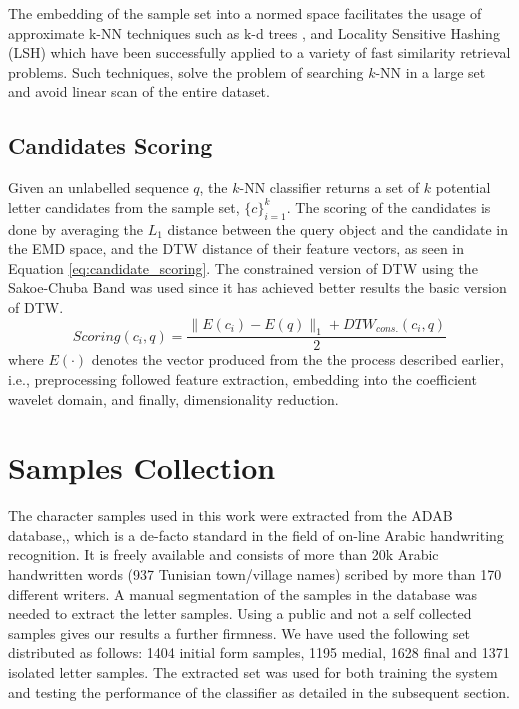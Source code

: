 \documentclass[10pt, conference, compsocconf]{IEEEtran}
\begin{document}
The embedding of the sample set into a normed space facilitates the usage of approximate k-NN techniques such as k-d trees \cite{bentley1975multidimensional}, and Locality Sensitive Hashing (LSH) \cite{gionis1999similarity} which have been successfully applied to a variety of fast similarity retrieval problems.
Such techniques, solve the problem of searching $k$-NN in a large set and avoid linear scan of the entire dataset.

\subsection{Candidates Scoring}
Given an unlabelled sequence $q$, the $k$-NN classifier returns a set of $k$ potential letter candidates from the sample set, $\{c\}_{i=1}^{k}$.
The scoring of the candidates is done by averaging the $L_1$ distance between the query object and the candidate in the EMD space, and the DTW distance of their feature vectors, as seen in Equation \ref{eq:candidate_scoring}.
The constrained version of DTW using the Sakoe-Chuba Band \cite{sakoe1978dynamic} was used since it has achieved better results the basic version of DTW.
\begin{equation}
Scoring(c_i,q)=\frac{\|E(c_i)-E(q)\|_1+DTW_{cons.}(c_i,q)}{2}
\label{eq:candidate_scoring}
\end{equation}
where $E(\cdot)$ denotes the vector produced from the the process described earlier, i.e., preprocessing followed feature extraction, embedding into the coefficient wavelet domain, and finally, dimensionality reduction.


\section{Samples Collection}
\label{sec:samples_collection}
The character samples used in this work were extracted from the ADAB database,\cite{el2009icdar}, which is a de-facto standard in the field of on-line Arabic handwriting recognition. 
It is freely available and consists of more than 20k Arabic handwritten words (937 Tunisian town/village names) scribed by more than 170 different writers. 
A manual segmentation of the samples in the database was needed to extract the letter samples.
Using a public and not a self collected samples gives our results a further firmness.
We have used the following set distributed as follows: 1404 initial form samples, 1195 medial, 1628 final and 1371 isolated letter samples. 
The extracted set was used for both training the system and testing the performance of the classifier as detailed in the subsequent section.
\end{document}

